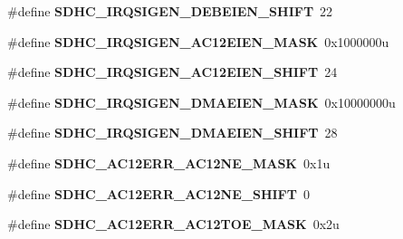 \begin{DoxyCompactItemize}
\item 
\#define {\bfseries S\+D\+H\+C\+\_\+\+I\+R\+Q\+S\+I\+G\+E\+N\+\_\+\+D\+E\+B\+E\+I\+E\+N\+\_\+\+S\+H\+I\+FT}~22\hypertarget{group__SDHC__Register__Masks_gac5c0c4b875fe244d9746cb09df94e6aa}{}\label{group__SDHC__Register__Masks_gac5c0c4b875fe244d9746cb09df94e6aa}

\item 
\#define {\bfseries S\+D\+H\+C\+\_\+\+I\+R\+Q\+S\+I\+G\+E\+N\+\_\+\+A\+C12\+E\+I\+E\+N\+\_\+\+M\+A\+SK}~0x1000000u\hypertarget{group__SDHC__Register__Masks_gacd242a1e4fdf5a31371c37720b6c5067}{}\label{group__SDHC__Register__Masks_gacd242a1e4fdf5a31371c37720b6c5067}

\item 
\#define {\bfseries S\+D\+H\+C\+\_\+\+I\+R\+Q\+S\+I\+G\+E\+N\+\_\+\+A\+C12\+E\+I\+E\+N\+\_\+\+S\+H\+I\+FT}~24\hypertarget{group__SDHC__Register__Masks_gad4b0bff90f4a58266dbbcc018d9b4b56}{}\label{group__SDHC__Register__Masks_gad4b0bff90f4a58266dbbcc018d9b4b56}

\item 
\#define {\bfseries S\+D\+H\+C\+\_\+\+I\+R\+Q\+S\+I\+G\+E\+N\+\_\+\+D\+M\+A\+E\+I\+E\+N\+\_\+\+M\+A\+SK}~0x10000000u\hypertarget{group__SDHC__Register__Masks_gae22dd330ad7d3c84dc6906ad0303ccc5}{}\label{group__SDHC__Register__Masks_gae22dd330ad7d3c84dc6906ad0303ccc5}

\item 
\#define {\bfseries S\+D\+H\+C\+\_\+\+I\+R\+Q\+S\+I\+G\+E\+N\+\_\+\+D\+M\+A\+E\+I\+E\+N\+\_\+\+S\+H\+I\+FT}~28\hypertarget{group__SDHC__Register__Masks_gaceacd386a2b3cdab5975252cf61ad06c}{}\label{group__SDHC__Register__Masks_gaceacd386a2b3cdab5975252cf61ad06c}

\item 
\#define {\bfseries S\+D\+H\+C\+\_\+\+A\+C12\+E\+R\+R\+\_\+\+A\+C12\+N\+E\+\_\+\+M\+A\+SK}~0x1u\hypertarget{group__SDHC__Register__Masks_ga41337efa0e8891905b61ceef4b4f20d4}{}\label{group__SDHC__Register__Masks_ga41337efa0e8891905b61ceef4b4f20d4}

\item 
\#define {\bfseries S\+D\+H\+C\+\_\+\+A\+C12\+E\+R\+R\+\_\+\+A\+C12\+N\+E\+\_\+\+S\+H\+I\+FT}~0\hypertarget{group__SDHC__Register__Masks_ga5f00efec00a18073d07677099619160d}{}\label{group__SDHC__Register__Masks_ga5f00efec00a18073d07677099619160d}

\item 
\#define {\bfseries S\+D\+H\+C\+\_\+\+A\+C12\+E\+R\+R\+\_\+\+A\+C12\+T\+O\+E\+\_\+\+M\+A\+SK}~0x2u\hypertarget{group__SDHC__Register__Masks_ga8e4439265574a0caa1a8bfa16f98d304}{}\label{group__SDHC__Register__Masks_ga8e4439265574a0caa1a8bfa16f98d304}


\end{DoxyCompactItemize}
